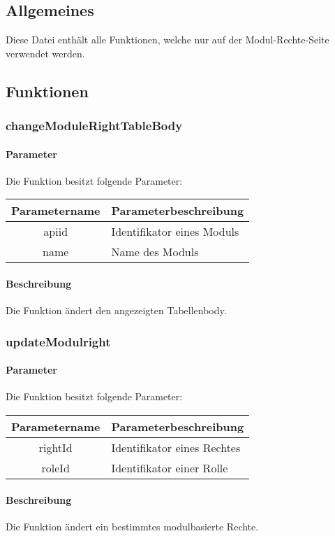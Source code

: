 \subsection{Allgemeines} Diese Datei enthält alle Funktionen, welche nur auf der Modul-Rechte-Seite verwendet werden.
\subsection{Funktionen}
\subsubsection{changeModuleRightTableBody}
\paragraph{Parameter} Die Funktion besitzt folgende Parameter:
\begin{table}[H]
	\begin{tabular}{|c|p{11cm}|}
		\hline
		\textbf{Parametername} & \textbf{Parameterbeschreibung} \\ \hline
		apiid & Identifikator eines Moduls \\ \hline
		name  & Name des Moduls \\ \hline
	\end{tabular}
\end{table}
\paragraph{Beschreibung} Die Funktion ändert den angezeigten Tabellenbody.
\subsubsection{updateModulright}
\paragraph{Parameter} Die Funktion besitzt folgende Parameter:
\begin{table}[H]
	\begin{tabular}{|c|p{11cm}|}
		\hline
		\textbf{Parametername} & \textbf{Parameterbeschreibung} \\ \hline
		rightId & Identifikator eines Rechtes \\ \hline
		roleId  & Identifikator einer Rolle \\ \hline
	\end{tabular}
\end{table}
\paragraph{Beschreibung} Die Funktion ändert ein bestimmtes modulbasierte Rechte.
